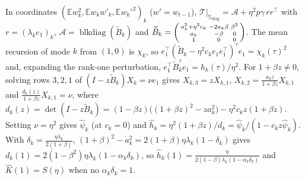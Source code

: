 \documentclass[11pt]{article}
\newcommand{\E}{\mathbb{E}}
\newcommand{\T}{\mathcal T}
\begin{document}
In coordinates $(\E w_k^2,\E w_kw'_k,\E w_k'^2)_k$ ($w'=w_{t-1}$), $\T|_{\mathbb S_{\mathrm{diag}}}=\mathcal A+\eta^2p\gamma\,rr^\top$ with $r=(\lambda_ke_1)_k$, $\mathcal A=\operatorname{blkdiag}(\widetilde B_k)$ and $\widetilde B_k=\begin{psmallmatrix}a_k^2+\eta^2c_k&-2a_k\beta&\beta^2\\ a_k&-\beta&0\\ 1&0&0\end{psmallmatrix}$. The mean recursion of mode $k$ from $(1,0)$ is $\chi_k$, so $e_1^\top(\widetilde B_k-\eta^2c_ke_1e_1^\top)^\tau e_1=\chi_k(\tau)^2$ and, expanding the rank-one perturbation, $e_1^\top\widetilde B_k^\tau e_1=h_k(\tau)/\eta^2$. For $1+\beta z\ne0$, solving rows $3,2,1$ of $(I-z\widetilde B_k)X_k=\nu e_1$ gives $X_{k,3}=zX_{k,1}$, $X_{k,2}=\frac{a_kz}{1+\beta z}X_{k,1}$ and $\frac{d_k(z)}{1+\beta z}X_{k,1}=\nu$, where $d_k(z)=\det(I-z\widetilde B_k)=(1-\beta z)\big((1+\beta z)^2-za_k^2\big)-\eta^2c_kz(1+\beta z)$. Setting $\nu=\eta^2$ gives $\widehat\psi_k$ (at $c_k=0$) and $\widehat h_k=\eta^2(1+\beta z)/d_k=\widehat\psi_k/(1-c_kz\widehat\psi_k)$. With $\delta_k=\frac{\eta\lambda_k}{2(1+\beta)}$, $(1+\beta)^2-a_k^2=2(1+\beta)\eta\lambda_k(1-\delta_k)$ gives $d_k(1)=2(1-\beta^2)\eta\lambda_k(1-\alpha_k\delta_k)$, so $\widehat h_k(1)=\frac{\eta}{2(1-\beta)\lambda_k(1-\alpha_k\delta_k)}$ and $\widehat K(1)=S(\eta)$ when no $\alpha_k\delta_k=1$.
\end{document}
